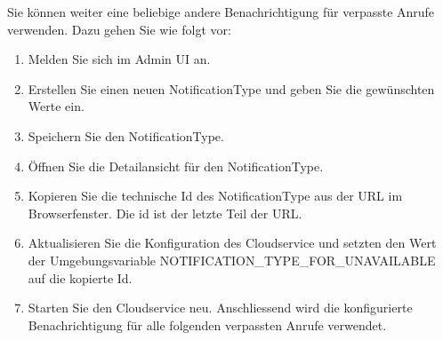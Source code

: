 Sie können weiter eine beliebige andere Benachrichtigung für verpasste Anrufe verwenden.
Dazu gehen Sie wie folgt vor:

\begin{enumerate}
    \item Melden Sie sich im Admin UI an.
    \item Erstellen Sie einen neuen NotificationType und geben Sie die gewünschten Werte ein.
    \item Speichern Sie den NotificationType.
    \item Öffnen Sie die Detailansicht für den NotificationType.
    \item Kopieren Sie die technische Id des NotificationType aus der URL im Browserfenster.
    Die id ist der letzte Teil der URL.
    \item Aktualisieren Sie die Konfiguration des Cloudservice und setzten den Wert der Umgebungsvariable NOTIFICATION\_TYPE\_FOR\_UNAVAILABLE auf die kopierte Id.
    \item Starten Sie den Cloudservice neu.
    Anschliessend wird die konfigurierte Benachrichtigung für alle folgenden verpassten Anrufe verwendet.
\end{enumerate}

\clearpage
